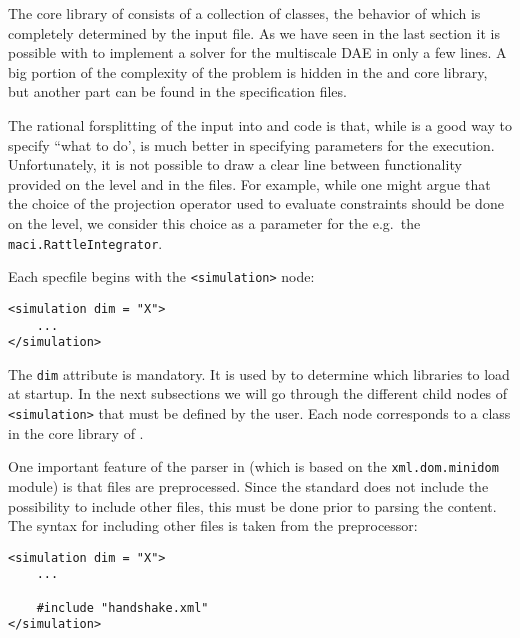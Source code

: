 
The core \PYTHON library of consists of a collection of \PYTHON classes, the behavior of which is completely determined by the \XML input file. As we have seen in the last section it is possible with \MACI to implement a solver for the multiscale DAE in only a few lines. A big portion of the complexity of the problem is hidden in the \CPP and \PYTHON core library, but another part can be found in the \XML specification files.\newline

The rational forsplitting of the \MACI input into \PYTHON and \XML code is that, while \PYTHON is a good way to specify ``what to do', \XML is much better in specifying parameters for the execution. Unfortunately, it is not possible to draw a clear line between functionality provided on the \PYTHON level and in the \XML files. For example, while one might argue that the choice of the projection operator used to evaluate constraints should be done on the \PYTHON level, we consider this choice as a parameter for the e.g.~the \lstinline[style=PYTHON]|maci.RattleIntegrator|.\newline

Each \MACI specfile begins with the \lstinline[style=XML]|<simulation>| node:

\begin{lstlisting}[style=XML_SMALL,frame=lines]
<simulation dim = "X">
	...
</simulation>
\end{lstlisting}

The \lstinline[style=XML]|dim| attribute is mandatory. It is used by \MACI to determine which libraries to load at startup. In the next subsections we will go through the different child nodes of \lstinline[style=XML]|<simulation>| that must be defined by the user. Each node corresponds to a class in the \PYTHON core library of \MACI.\newline

One important feature of the \XML parser in \MACI (which is based on the \lstinline[style=PYTHON]|xml.dom.minidom| \PYTHON module) is that \XML files are preprocessed. Since the \XML standard does not include the possibility to include other \XML files, this must be done prior to parsing the \XML content. The syntax for including other \XML files is taken from the \C preprocessor:

\begin{lstlisting}[style=XML_SMALL,frame=lines]
<simulation dim = "X">
	...
	
	#include "handshake.xml"
</simulation>
\end{lstlisting}

